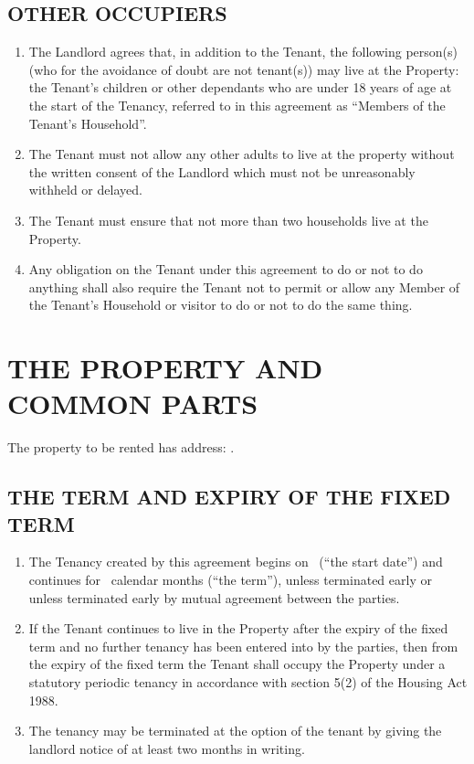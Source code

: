 \subsection{OTHER OCCUPIERS}

\begin{enumerate}
\item{The Landlord agrees that, in addition to the Tenant, the following person(s) (who for the avoidance of doubt are not tenant(s)) may live at the Property: the Tenant's children or other dependants who are under 18 years of age at the start of the Tenancy, referred to in this agreement as ``Members of the Tenant's Household''.}

\item{The Tenant must not allow any other adults to live at the property without the written consent of the Landlord which must not be unreasonably withheld or delayed.}

\item{The Tenant must ensure that not more than two households live at the Property.}

\item{Any obligation on the Tenant under this agreement to do or not to do anything shall also require the Tenant not to permit or allow any Member of the Tenant's Household or visitor to do or not to do the same thing.}
\end{enumerate}

\section{THE PROPERTY AND COMMON PARTS}

The property to be rented has address: \Address {}.

\subsection{THE TERM AND EXPIRY OF THE FIXED TERM}

\begin{enumerate}

\item{The Tenancy created by this agreement begins on \StartDate\ (``the start date'') and continues for \Term\ calendar months (``the term''), unless terminated early or unless terminated early by mutual agreement between the parties.}

\item{If the Tenant continues to live in the Property after the expiry of the fixed term and no further tenancy has been entered into by the parties, then from the expiry of the fixed term the Tenant shall occupy the Property under a statutory periodic tenancy in accordance with section 5(2) of the Housing Act 1988.}

\item{The tenancy may be terminated at the option of the tenant by giving the landlord notice of at least two months in writing.}

\end{enumerate}

